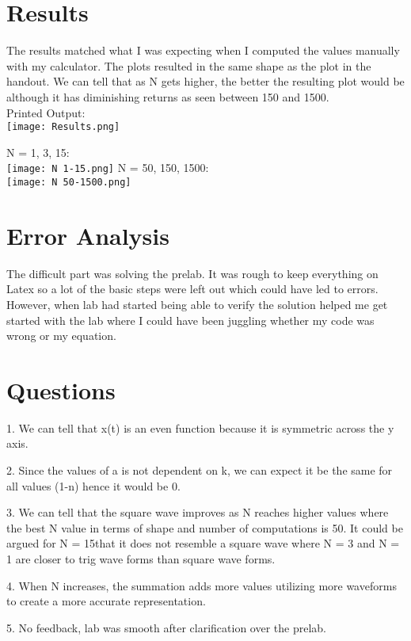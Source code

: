 \documentclass[12pt]{report}
\begin{document}
\section{Results}

The results matched what I was expecting when I computed the values manually with my calculator. The plots resulted in the same shape as the plot in the handout. We can tell that as N gets higher, the better the resulting plot would be although it has diminishing returns as seen between 150 and 1500. 
\\
Printed Output:
\\ \texttt{[image: Results.png]}

N = 1, 3, 15:
\\ \texttt{[image: N 1-15.png]}
\newpage
N = 50, 150, 1500:
\\ \texttt{[image: N 50-1500.png]}




\section{Error Analysis}

The difficult part was solving the prelab. It was rough to keep everything on Latex so a lot of the basic steps were left out which could have led to errors. However, when lab had started being able to verify the solution helped me get started with the lab where I could have been juggling whether my code was wrong or my equation. 

\section{Questions}
1. We can tell that x(t) is an even function because it is symmetric across the y axis. 

2. Since the values of a is not dependent on k, we can expect it be the same for all values (1-n) hence it would be 0. 

3. We can tell that the square wave improves as N reaches higher values where the best N value in terms of shape and number of computations is 50.  It could be argued for N = 15that it does not resemble a square wave where N = 3 and N = 1 are closer to trig wave forms than square wave forms. 

4. When N increases, the summation adds more values utilizing more waveforms to create a more accurate representation. 

5. No feedback, lab was smooth after clarification over the prelab. 
\end{document}
